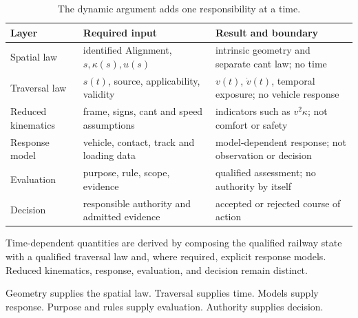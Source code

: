 \begin{table}[htbp]
\centering
\small
\begin{tabular}{p{}p{}p{}}
\toprule
\textbf{Layer} & \textbf{Required input} & \textbf{Result and boundary}\\
\midrule
Spatial law & identified Alignment, \(s,\kappa(s),u(s)\) & intrinsic geometry and separate cant law; no time\\
Traversal law & \(s(t)\), source, applicability, validity & \(v(t)\), \(\dot v(t)\), temporal exposure; no vehicle response\\
Reduced kinematics & frame, signs, cant and speed assumptions & indicators such as \(v^2\kappa\); not comfort or safety\\
Response model & vehicle, contact, track and loading data & model-dependent response; not observation or decision\\
Evaluation & purpose, rule, scope, evidence & qualified assessment; no authority by itself\\
Decision & responsible authority and admitted evidence & accepted or rejected course of action\\
\bottomrule
\end{tabular}
\caption{The dynamic argument adds one responsibility at a time.}
\label{tab:dynamics-responsibility-layers}
\end{table}

\begin{principle}
\label{princ:dynamic-state-interpretation}
Time-dependent quantities are derived by composing the qualified railway state
with a qualified traversal law and, where required, explicit response models.
Reduced kinematics, response, evaluation, and decision remain distinct.
\end{principle}

\begin{summary}
Geometry supplies the spatial law. Traversal supplies time. Models supply
response. Purpose and rules supply evaluation. Authority supplies decision.
\end{summary}
